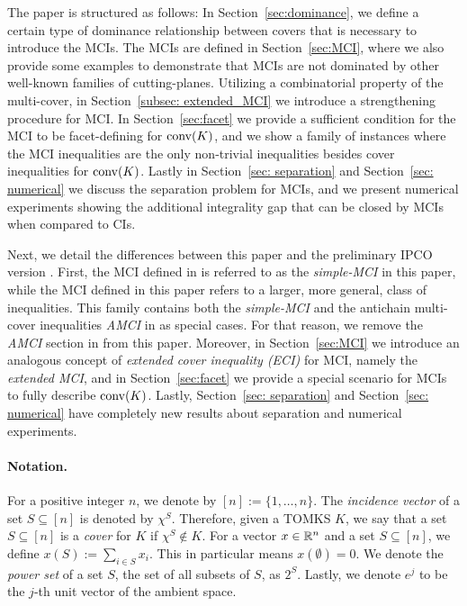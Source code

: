 The paper is structured as follows: In Section~\ref{sec:dominance}, we define a certain type of dominance relationship between covers that is necessary to introduce the MCIs.  
The MCIs are defined in Section~\ref{sec:MCI}, where we also provide some examples to demonstrate that MCIs are not dominated by other well-known families of cutting-planes.  
Utilizing a combinatorial property of the multi-cover, in Section~\ref{subsec: extended_MCI} we introduce a strengthening procedure for MCI.
In Section~\ref{sec:facet} we provide a sufficient condition for the MCI to be facet-defining for $\operatorname{conv}(K)$, and we show a family of instances where the MCI inequalities are the only non-trivial inequalities besides cover inequalities for $\operatorname{conv}(K)$. 
Lastly in Section~\ref{sec: separation} and Section~\ref{sec: numerical} we discuss the separation problem for MCIs, and we present numerical experiments showing the additional integrality gap that can be closed by MCIs when compared to CIs. 


Next, we detail the differences between this paper and the preliminary IPCO version \cite{del2021multi}. 
First, the MCI defined in \cite{del2021multi} is referred to as the \emph{simple-MCI} in this paper, while the MCI defined in this paper refers to a larger, more general, class of inequalities.  This family contains both the \emph{simple-MCI} and the antichain multi-cover inequalities \emph{AMCI} in \cite{del2021multi} as special cases. 
For that reason, we remove the \emph{AMCI} section in \cite{del2021multi} from this paper.
Moreover, in Section~\ref{sec:MCI} we introduce an analogous concept of \emph{extended cover inequality (ECI)} for MCI, namely the \emph{extended MCI}, and in Section~\ref{sec:facet} we provide a special scenario for MCIs to fully describe $\operatorname{conv}(K)$.  Lastly, Section~\ref{sec: separation} and Section~\ref{sec: numerical} have completely new results about separation and numerical experiments. 


\paragraph{Notation.}
For a positive integer $n$, we denote by $[n] := \{1,\dots,n\}$.
The \emph{incidence vector} of a set $S \subseteq [n]$ is denoted by $\chi^S$.
Therefore, given a TOMKS $K$, we say that a set $S \subseteq [n]$ is a \emph{cover} for $K$ if $\chi^S \notin K$. 
For a vector $x \in \mathbb{R}^n$ and a set $S \subseteq [n]$, we define $x(S) := \sum_{i \in S} x_i$. 
This in particular means $x(\emptyset) = 0.$ 
We denote the \emph{power set} of a set $S$, the set of all subsets of $S$, as $2^S$.
Lastly, we denote $e^j$ to be the $j$-th unit vector of the ambient space. 




